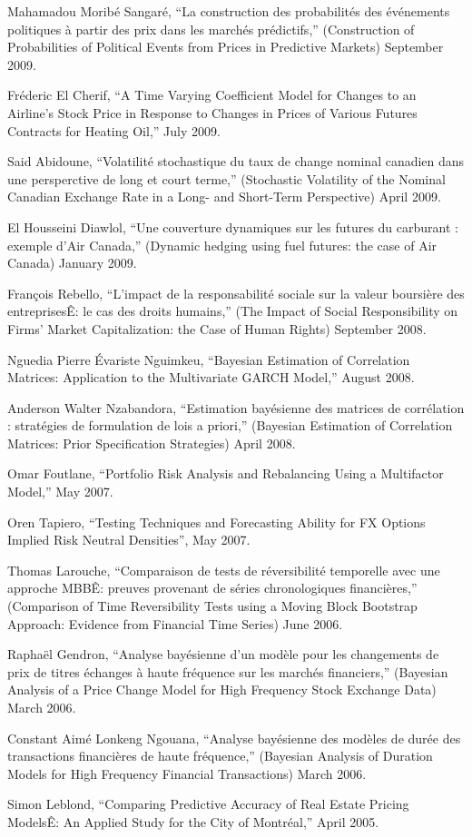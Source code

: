 \documentclass[12pt]{article}
\begin{document}
Mahamadou Morib\'e Sangar\'e,
``La construction des probabilit\'es des \'ev\'enements politiques \`a 
partir des prix dans les march\'es pr\'edictifs,''
(Construction of Probabilities of Political Events from Prices in Predictive Markets)
September 2009.

Fr\'ederic El Cherif,
``A Time Varying Coefficient Model for Changes to an Airline's Stock Price in 
Response to Changes in Prices of Various Futures Contracts for Heating Oil,''
July 2009.

Said Abidoune,
``Volatilit\'e stochastique du taux de change nominal canadien dans une persperctive de long et court terme,''
(Stochastic Volatility of the Nominal Canadian Exchange Rate in a Long- and Short-Term Perspective)
April 2009.

El Housseini Diawlol,
``Une couverture dynamiques sur les futures du carburant : exemple d'Air Canada,''
(Dynamic hedging using fuel futures: the case of Air Canada)
January 2009.

Fran\c{c}ois Rebello,
``L'impact de la responsabilit\'e sociale sur la valeur boursi\`ere des entreprisesÊ: le cas des droits humains,''
(The Impact of Social Responsibility on Firms' Market Capitalization: the Case of Human Rights)
September 2008.

Nguedia Pierre \'Evariste Nguimkeu,
``Bayesian Estimation of Correlation Matrices:
Application to the Multivariate GARCH Model,''
August 2008.

Anderson Walter Nzabandora,
``Estimation bay\'esienne des matrices de corr\'elation : strat\'egies de formulation de lois a priori,''
(Bayesian Estimation of Correlation Matrices: Prior Specification Strategies)
April 2008.

Omar Foutlane,
``Portfolio Risk Analysis and Rebalancing Using a Multifactor Model,''
May 2007.

Oren Tapiero,
``Testing Techniques and Forecasting Ability for FX Options Implied Risk
Neutral Densities'',
May 2007.

Thomas Larouche,
``Comparaison de tests de r\'eversibilit\'e temporelle avec une approche MBBÊ: preuves provenant de s\'eries chronologiques financi\`eres,''
(Comparison of Time Reversibility Tests using a Moving Block Bootstrap Approach: Evidence from Financial Time Series)
June 2006.

Rapha\"el Gendron,
``Analyse bay\'esienne d'un mod\`ele pour les changements de prix de titres \'echanges \`a haute fr\'equence sur les march\'es financiers,''
(Bayesian Analysis of a Price Change Model for High Frequency Stock Exchange
Data)
March 2006.

Constant Aim\'e Lonkeng Ngouana,
``Analyse bay\'esienne des mod\`eles de dur\'ee des transactions financi\`eres de haute fr\'equence,''
(Bayesian Analysis of Duration Models for High Frequency Financial Transactions)
March 2006.

Simon Leblond,
``Comparing Predictive Accuracy of Real Estate Pricing ModelsÊ: An Applied Study for the City of Montr\'eal,''
April 2005.
\end{document}
